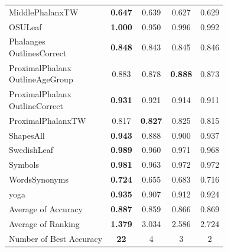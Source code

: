 \documentclass[conference]{IEEEtran}
\begin{document}
\begin{table}[htb]
{\begin{tabular}{lcccc}
      MiddlePhalanxTW & \textbf{0.647} & 0.639 & 0.627 & 0.629 \\
      OSULeaf & \textbf{1.000} & 0.950 & 0.996 & 0.992 \\
      \makecell[l]{Phalanges\\OutlinesCorrect} & \textbf{0.848} & 0.843 & 0.845 & 0.846 \\
      \makecell[l]{ProximalPhalanx\\OutlineAgeGroup} & 0.883 & 0.878 & \textbf{0.888} & 0.873 \\
      \makecell[l]{ProximalPhalanx\\OutlineCorrect} & \textbf{0.931} & 0.921 & 0.914 & 0.911 \\
      ProximalPhalanxTW & 0.817 & \textbf{0.827} & 0.825 & 0.815 \\
      ShapesAll & \textbf{0.943} & 0.888 & 0.900 & 0.937 \\
      SwedishLeaf & \textbf{0.989} & 0.960 & 0.971 & 0.968 \\
      Symbols & \textbf{0.981} & 0.963 & 0.972 & 0.972 \\
      WordsSynonyms & \textbf{0.724} & 0.655 & 0.683 & 0.716 \\
      yoga & \textbf{0.935} & 0.907 & 0.912 & 0.924 \\
      \midrule
      Average of Accuracy & \textbf{0.887} & 0.859 & 0.866 & 0.869 \\
      Average of Ranking & \textbf{1.379} & 3.034 & 2.586 & 2.724 \\
      Number of Best Accuracy & \textbf{22} & 4 & 3 & 2 \\
      \bottomrule
    \end{tabular}
  }
\end{table}
\end{document}
